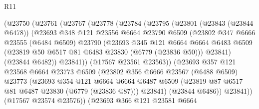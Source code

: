 \begin{lexlean}{R11}
\begin{coremodule}
{{{{{{{{{{{{{{{{{{{{{{{{{{{{{{{{{{{{{{{{{{{{{{{{{{{{{{{{{{{{{{{{{{{{{{{{{{{{{{{{{{                  (@23750
                    (@23761
                      (@23767
                        (@23778
                          (@23784
                            (@23795
                              (@23801
                                (@23843 (@23844 @6478))
                                (@23693
                                  @348
                                  @121
                                  @23556
                                  @6664
                                  @23790
                                  @6509
                                  (@23802
                                    @347
                                    @6666
                                    @23555
                                    (@6484 @6509)
                                    @23790
                                    (@23693
                                      @345
                                      @121
                                      @6664
                                      @6664
                                      @6483
                                      @6509
                                      (@23819 @50 @6517 @81 @6483 @23830 (@6779 (@23836 @50)))
                                      @23841)
                                    (@23844 @6482))
                                  @23841))
                              (@17567 @23561 @23563))
                            (@23693
                              @357
                              @121
                              @23568
                              @6664
                              @23773
                              @6509
                              (@23802
                                @356
                                @6666
                                @23567
                                (@6488 @6509)
                                @23773
                                (@23693
                                  @354
                                  @121
                                  @6664
                                  @6664
                                  @6487
                                  @6509
                                  (@23819 @87 @6517 @81 @6487 @23830 (@6779 (@23836 @87)))
                                  @23841)
                                (@23844 @6486))
                              @23841))
                          (@17567 @23574 @23576))
                        (@23693
                          @366
                          @121
                          @23581
                          @6664
}}}}}}}}}}}}}}}}}}}}}}}}}}}}}}}}}}}}}}}}}}}}}}}}}}}}}}}}}}}}}}}}}}}}}}}}}}}}}}}}}}
\end{coremodule}
\end{lexlean}
